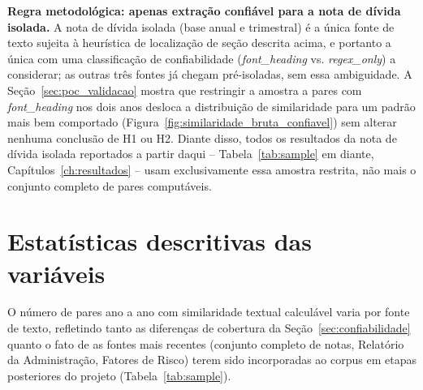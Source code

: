 \documentclass[a4paper,12pt]{report}
\begin{document}
\textbf{Regra metodológica: apenas extração confiável para a nota de dívida isolada.} A nota de dívida isolada (base anual e trimestral) é a única fonte de texto sujeita à heurística de localização de seção descrita acima, e portanto a única com uma classificação de confiabilidade (\textit{font\_heading} vs. \textit{regex\_only}) a considerar; as outras três fontes já chegam pré-isoladas, sem essa ambiguidade. A Seção~\ref{sec:poc_validacao} mostra que restringir a amostra a pares com \textit{font\_heading} nos dois anos desloca a distribuição de similaridade para um padrão mais bem comportado (Figura~\ref{fig:similaridade_bruta_confiavel}) sem alterar nenhuma conclusão de H1 ou H2. Diante disso, todos os resultados da nota de dívida isolada reportados a partir daqui -- Tabela~\ref{tab:sample} em diante, Capítulos~\ref{ch:resultados} -- usam exclusivamente essa amostra restrita, não mais o conjunto completo de pares computáveis.

\section{Estatísticas descritivas das variáveis}
\label{sec:estatisticas}

O número de pares ano a ano com similaridade textual calculável varia por fonte de texto, refletindo tanto as diferenças de cobertura da Seção~\ref{sec:confiabilidade} quanto o fato de as fontes mais recentes (conjunto completo de notas, Relatório da Administração, Fatores de Risco) terem sido incorporadas ao corpus em etapas posteriores do projeto (Tabela~\ref{tab:sample}).
\end{document}
